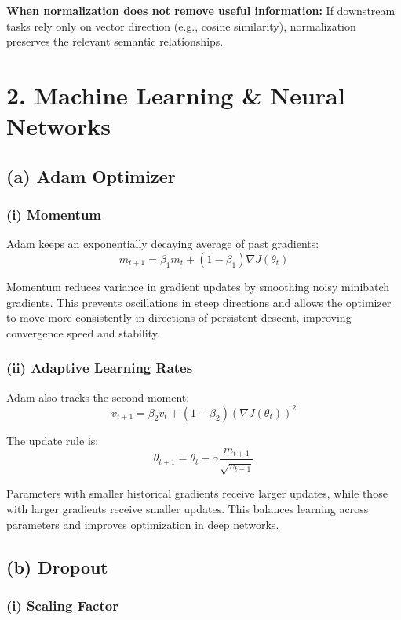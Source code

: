 \documentclass[11pt]{article}
\begin{document}
\textbf{When normalization does not remove useful information:}
If downstream tasks rely only on vector direction (e.g., cosine similarity), normalization preserves the relevant semantic relationships.

\section*{2. Machine Learning \& Neural Networks}

\subsection*{(a) Adam Optimizer}

\subsubsection*{(i) Momentum}

Adam keeps an exponentially decaying average of past gradients:
\[
m_{t+1} = \beta_1 m_t + (1-\beta_1)\nabla J(\theta_t)
\]

Momentum reduces variance in gradient updates by smoothing noisy minibatch gradients. This prevents oscillations in steep directions and allows the optimizer to move more consistently in directions of persistent descent, improving convergence speed and stability.

\subsubsection*{(ii) Adaptive Learning Rates}

Adam also tracks the second moment:
\[
v_{t+1} = \beta_2 v_t + (1-\beta_2)(\nabla J(\theta_t))^2
\]

The update rule is:
\[
\theta_{t+1} = \theta_t - \alpha \frac{m_{t+1}}{\sqrt{v_{t+1}}}
\]

Parameters with smaller historical gradients receive larger updates, while those with larger gradients receive smaller updates. This balances learning across parameters and improves optimization in deep networks.

\subsection*{(b) Dropout}

\subsubsection*{(i) Scaling Factor}
\end{document}
